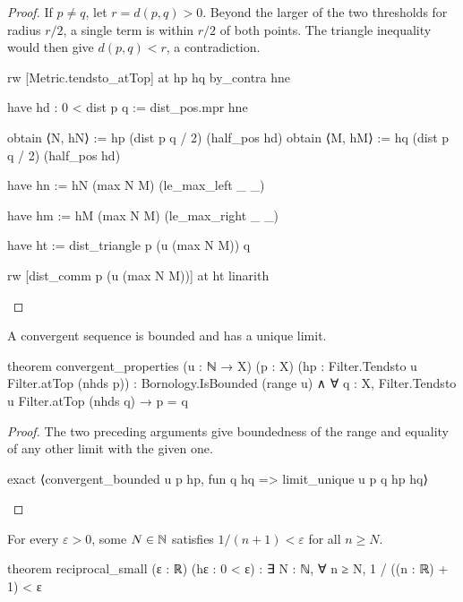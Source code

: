 \begin{proof}
  If $p\ne q$, let $r=d(p,q)>0$.
  Beyond the larger of the two thresholds for radius $r/2$, a single term is within $r/2$ of both
  points.
  The triangle inequality would then give $d(p,q)<r$, a contradiction.

  \begin{lean}
    rw [Metric.tendsto_atTop] at hp hq
    by_contra hne

    have hd : 0 < dist p q := dist_pos.mpr hne

    obtain ⟨N, hN⟩ := hp (dist p q / 2) (half_pos hd)
    obtain ⟨M, hM⟩ := hq (dist p q / 2) (half_pos hd)

    have hn := hN (max N M) (le_max_left _ _)

    have hm := hM (max N M) (le_max_right _ _)

    have ht := dist_triangle p (u (max N M)) q

    rw [dist_comm p (u (max N M))] at ht
    linarith
  \end{lean}

\end{proof}

\begin{proposition}
  \label{an1:thm:convergent-sequence-is-bounded}
  A convergent sequence is bounded and has a unique limit.

  \begin{lean}
    theorem convergent_properties (u : ℕ → X) (p : X) (hp : Filter.Tendsto u Filter.atTop (nhds p)) :
        Bornology.IsBounded (range u) ∧ ∀ q : X, Filter.Tendsto u Filter.atTop (nhds q) → p = q
  \end{lean}
\end{proposition}

\begin{proof}
  The two preceding arguments give boundedness of the range and equality of any other limit with
  the given one.

  \begin{lean}
    exact ⟨convergent_bounded u p hp, fun q hq => limit_unique u p q hp hq⟩
  \end{lean}

\end{proof}

\begin{lemma}
  \label{an1:lem:reciprocal-small}
  For every $\varepsilon>0$, some $N\in\mathbb{N}$ satisfies $1/(n+1)<\varepsilon$ for all $n\geq N$.

  \begin{lean}
    theorem reciprocal_small (ε : ℝ) (hε : 0 < ε) :
        ∃ N : ℕ, ∀ n ≥ N, 1 / ((n : ℝ) + 1) < ε
  \end{lean}
\end{lemma}

